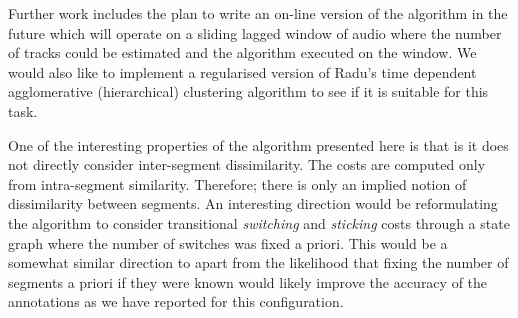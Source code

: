 \documentclass[twocolumn]{article}
\begin{document}
Further work includes the plan to write an on-line version of the algorithm in the future which will operate on a sliding lagged window of audio where the number of tracks could be estimated and the algorithm executed on the window. We would also like to implement a regularised version of Radu's time dependent agglomerative (hierarchical) clustering algorithm \citep{radu} to see if it is suitable for this task. 

One of the interesting properties of the algorithm presented here is that is it does not directly consider inter-segment dissimilarity. The costs are computed only from intra-segment similarity. Therefore; there is only an implied notion of dissimilarity between segments. An interesting direction would be reformulating the algorithm to consider transitional \textit{switching} and \textit{sticking} costs through a state graph where the number of switches was fixed a priori. This would be a somewhat similar direction to \citep{goodwin2003audio,goodwin2004dynamic} apart from the likelihood that fixing the number of segments a priori if they were known would likely improve the accuracy of the annotations as we have reported for this configuration.
\end{document}
